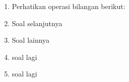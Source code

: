 \documentclass{article}
\begin{document}
\begin{enumerate}
     \textbf{Jawaban:}\\
     jawabannya adalah
    
  \item Perhatikan operasi bilangan berikut:
  \item Soal selanjutnya
  \item Soal lainnya
  \item soal lagi
  \item soal lagi


  
\end{enumerate}
\end{document}
